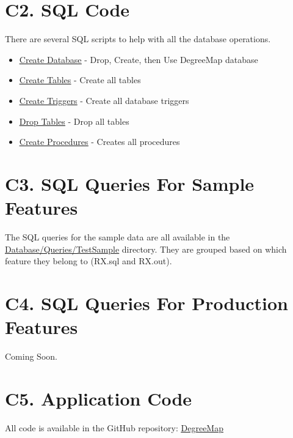 \documentclass[12pt, a4paper]{article}
\begin{document}
\section*{C2. SQL Code}
There are several SQL scripts to help with all the database operations.

\begin{itemize}
    \item \underline{\href{https://github.com/Kggupta/DegreeMap/blob/main/Database/Queries/CreateDatabase.sql}{Create Database}} - Drop, Create, then Use DegreeMap database
    \item \underline{\href{https://github.com/Kggupta/DegreeMap/blob/main/Database/Queries/CreateTables.sql}{Create Tables}} - Create all tables
    \item \underline{\href{https://github.com/Kggupta/DegreeMap/blob/main/Database/Queries/CreateTriggers.sql}{Create Triggers}} - Create all database triggers
    \item \underline{\href{https://github.com/Kggupta/DegreeMap/blob/main/Database/Queries/DropTables.sql}{Drop Tables}} - Drop all tables
    \item \underline{\href{https://github.com/Kggupta/DegreeMap/blob/main/Database/Queries/Procedures.sql}{Create Procedures}} - Creates all procedures
\end{itemize}
\section*{C3. SQL Queries For Sample Features}
The SQL queries for the sample data are all available in the \underline{\href{https://github.com/Kggupta/DegreeMap/tree/main/Database/Queries/TestSample}{Database/Queries/TestSample}} directory. They are grouped based on which feature they belong to (RX.sql and RX.out).
\section*{C4. SQL Queries For Production Features}
Coming Soon.
\section*{C5. Application Code}
All code is available in the GitHub repository: \underline{\href{https://github.com/Kggupta/DegreeMap}{DegreeMap}}
\end{document}
